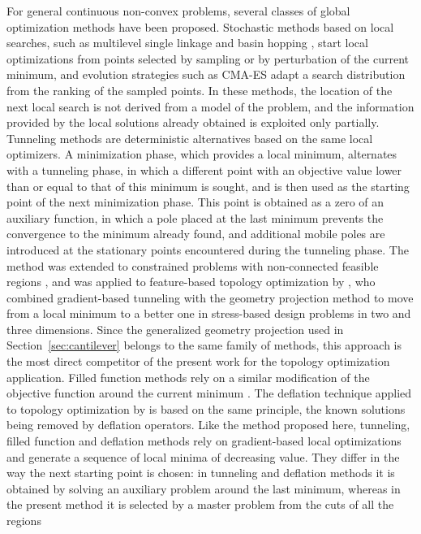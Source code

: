 \documentclass[pdflatex,sn-basic]{sn-jnl}
\begin{document}
For general continuous non-convex problems, several classes of global
optimization methods have been proposed. Stochastic methods based on local
searches, such as multilevel single linkage \citep{rinnooykan1987} and basin
hopping \citep{wales1997}, start local optimizations from points selected by
sampling or by perturbation of the current minimum, and evolution strategies
such as CMA-ES \citep{hansen2001} adapt a search distribution from the ranking
of the sampled points. In these methods, the location of the next local search
is not derived from a model of the problem, and the information provided by the
local solutions already obtained is exploited only partially.
Tunneling methods \citep{levy1985,levygomez1985} are deterministic alternatives
based on the same local optimizers. A minimization phase, which provides a local
minimum, alternates with a tunneling phase, in which a different point with an
objective value lower than or equal to that of this minimum is sought, and is
then used as the starting point of the next minimization phase. This point is
obtained as a zero of an auxiliary function, in which a pole placed at the last
minimum prevents the convergence to the minimum already found, and additional mobile
poles are introduced at the stationary points encountered during the tunneling
phase. The method was
extended to constrained problems with non-connected feasible regions
\citep{gomez1982}, and was applied to feature-based topology optimization by
\citet{zhang2018tunneling}, who combined gradient-based tunneling with the
geometry projection method to move from a local minimum to a better one in
stress-based design problems in two and three dimensions. Since the
generalized geometry projection used in Section~\ref{sec:cantilever} belongs to
the same family of methods, this approach is the most direct competitor of the
present work for the topology optimization application. Filled function methods
rely on a similar modification of the objective function around the current minimum \citep{ge1990}. The deflation
technique applied to topology optimization by \citet{papadopoulos2021} is based
on the same principle, the known solutions being removed by deflation
operators. Like the method proposed here, tunneling, filled function and
deflation methods rely on gradient-based local optimizations and generate a
sequence of local minima of decreasing value. They differ in the way the next
starting point is chosen: in tunneling and deflation methods it is obtained by
solving an auxiliary problem around the last minimum, whereas in the present
method it is selected by a master problem from the cuts of all the regions
\end{document}

